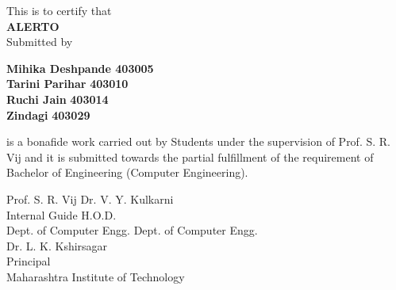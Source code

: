 \documentclass[12pt,a4paper]{report}
\begin{document}
	\begin{center}
This is to certify that \\
\textbf{\large ALERTO}\\
Submitted by\\
	\begin{flushleft}
		\begin{flushleft}
			\hspace{1.7in}\textbf{Mihika Deshpande     403005}\\
			\hspace{1.7in}\textbf{Tarini Parihar}    
			\hspace{0.3in}\textbf{  403010}\\
			\hspace{1.7in}\textbf{Ruchi Jain}\hspace{0.65in}\textbf{           403014}\\
			\hspace{1.7in}\textbf{Zindagi}\hspace{0.94in}\textbf{              403029}\\
		\end{flushleft}
	\end{flushleft}
	
	is a bonafide work carried out by Students under the supervision of Prof. S. R. Vij and it is submitted towards the partial fulfillment of the requirement of Bachelor of Engineering (Computer Engineering).
		\begin{center}
	Prof. S. R. Vij \hspace{0.95 in} \hspace{0.95 in} \hspace{0.95 in}Dr. V. Y. Kulkarni\\
	Internal Guide \hspace{0.9 in} \hspace{0.9 in} \hspace{0.9 in} \hspace{0.9 in} H.O.D.\\
	Dept. of Computer Engg. \hspace{0.7 in} \hspace{0.7 in} \hspace{0.7 in} Dept. of Computer Engg.\\

		Dr. L. K. Kshirsagar\\
		Principal\\
		Maharashtra Institute of Technology
	
	\vspace{0.5 in}
	

\end{center}
\end{center}
\end{document}
